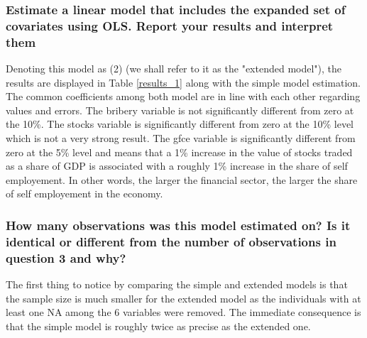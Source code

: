\subsubsection{Estimate a linear model that includes the expanded set of covariates using OLS. Report
your results and interpret them}
Denoting this model as (2) (we shall refer to it as the "extended model"), the results are displayed in Table \ref{results_1} along with the simple model estimation.
The common coefficients among both model are in line with each other regarding values and errors.
The bribery variable is not significantly different from zero at the 10\%.
The stocks variable is significantly different from zero at the 10\% level which is not a very strong result.
The gfce variable is significantly different from zero at the 5\% level and means that a 1\% increase in the value of stocks traded as a share of GDP is associated with a roughly 1\% increase in the share of self employement.
In other words, the larger the financial sector, the larger the share of self employement in the economy. 
\subsubsection{How many observations was this model estimated on? Is it identical or different from the number of observations in question 3 and why?}
The first thing to notice by comparing the simple and extended models is that the sample size is much smaller for the extended
model as the individuals with at least one NA among the 6 variables were removed.
The immediate consequence is that the simple model is roughly twice as precise as the extended one.

